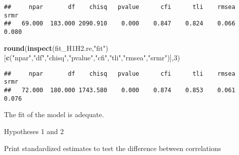 \documentclass[
]{article}
\newenvironment{Shaded}{\begin{snugshade}}{\end{snugshade}}
\newcommand{\DecValTok}[1]{\textcolor[rgb]{0.00,0.00,0.81}{#1}}
\newcommand{\KeywordTok}[1]{\textcolor[rgb]{0.13,0.29,0.53}{\textbf{#1}}}
\newcommand{\NormalTok}[1]{#1}
\newcommand{\OperatorTok}[1]{\textcolor[rgb]{0.81,0.36,0.00}{\textbf{#1}}}
\newcommand{\StringTok}[1]{\textcolor[rgb]{0.31,0.60,0.02}{#1}}
\begin{document}
\begin{verbatim}
##     npar       df    chisq   pvalue      cfi      tli    rmsea     srmr 
##   69.000  183.000 2090.910    0.000    0.847    0.824    0.066    0.080
\end{verbatim}

\begin{Shaded}
\begin{Highlighting}[]
\KeywordTok{round}\NormalTok{(}\KeywordTok{inspect}\NormalTok{(fit_H1H2.re,}\StringTok{"fit"}\NormalTok{)}
\NormalTok{      [}\KeywordTok{c}\NormalTok{(}\StringTok{"npar"}\NormalTok{,}\StringTok{"df"}\NormalTok{,}\StringTok{"chisq"}\NormalTok{,}\StringTok{"pvalue"}\NormalTok{,}\StringTok{"cfi"}\NormalTok{,}\StringTok{"tli"}\NormalTok{,}\StringTok{"rmsea"}\NormalTok{,}\StringTok{"srmr"}\NormalTok{)],}\DecValTok{3}\NormalTok{)}
\end{Highlighting}
\end{Shaded}

\begin{verbatim}
##     npar       df    chisq   pvalue      cfi      tli    rmsea     srmr 
##   72.000  180.000 1743.580    0.000    0.874    0.853    0.061    0.076
\end{verbatim}

The fit of the model is adequate.

Hypotheses 1 and 2

Print standardized estimates to test the difference between correlations

\begin{Shaded}
\end{Shaded}
\end{document}
